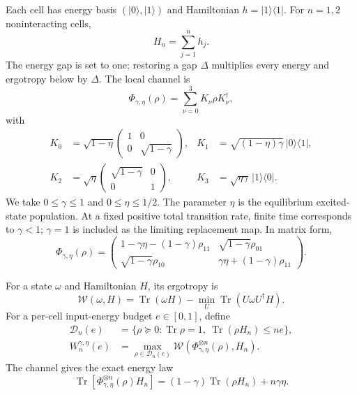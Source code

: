 \documentclass[pra,aps,twocolumn,nofootinbib,superscriptaddress]{revtex4-2}
\newcommand{\Tr}{\operatorname{Tr}}
\newcommand{\W}{\mathcal{W}}
\newcommand{\Dset}{\mathcal{D}}
\begin{document}
Each cell has energy basis $(|0\rangle,|1\rangle)$ and Hamiltonian
$h=|1\rangle\langle1|$.  For $n=1,2$ noninteracting cells,
\begin{equation}
 H_n=\sum_{j=1}^{n}h_j .
\end{equation}
The energy gap is set to one; restoring a gap $\Delta$ multiplies every
energy and ergotropy below by $\Delta$.  The local channel is
\begin{equation}
 \Phi_{\gamma,\eta}(\rho)=\sum_{\nu=0}^{3}K_\nu\rho K_\nu^\dagger,
\end{equation}
with
\begin{align}
K_0&=\sqrt{1-\eta}\begin{pmatrix}1&0\\0&\sqrt{1-\gamma}\end{pmatrix},&
K_1&=\sqrt{(1-\eta)\gamma}\,|0\rangle\langle1|,\nonumber\\
K_2&=\sqrt{\eta}\begin{pmatrix}\sqrt{1-\gamma}&0\\0&1\end{pmatrix},&
K_3&=\sqrt{\eta\gamma}\,|1\rangle\langle0| .
\label{eq:kraus}
\end{align}
We take $0\leq\gamma\leq1$ and $0\leq\eta\leq1/2$.  The parameter $\eta$
is the equilibrium excited-state population.  At a fixed positive total
transition rate, finite time corresponds to $\gamma<1$; $\gamma=1$ is
included as the limiting replacement map.  In matrix form,
\begin{equation}
\Phi_{\gamma,\eta}(\rho)=
\begin{pmatrix}
1-\gamma\eta-(1-\gamma)\rho_{11}&\sqrt{1-\gamma}\rho_{01}\\
\sqrt{1-\gamma}\rho_{10}&\gamma\eta+(1-\gamma)\rho_{11}
\end{pmatrix}.
\label{eq:channel-action}
\end{equation}

For a state $\omega$ and Hamiltonian $H$, its ergotropy is
\begin{equation}
 \W(\omega,H)=\Tr(\omega H)-\min_U\Tr(U\omega U^\dagger H).
\label{eq:ergotropy}
\end{equation}
For a per-cell input-energy budget $e\in[0,1]$, define
\begin{align}
\Dset_n(e)&=\{\rho\succeq0:\Tr\rho=1,\ \Tr(\rho H_n)\leq ne\},\\
W_n^{\gamma,\eta}(e)&=\max_{\rho\in\Dset_n(e)}
 \W\!\left(\Phi_{\gamma,\eta}^{\otimes n}(\rho),H_n\right).
\label{eq:Wn}
\end{align}
The channel gives the exact energy law
\begin{equation}
 \Tr[\Phi_{\gamma,\eta}^{\otimes n}(\rho)H_n]
 =(1-\gamma)\Tr(\rho H_n)+n\gamma\eta.
\label{eq:energy-law}
\end{equation}
\end{document}
